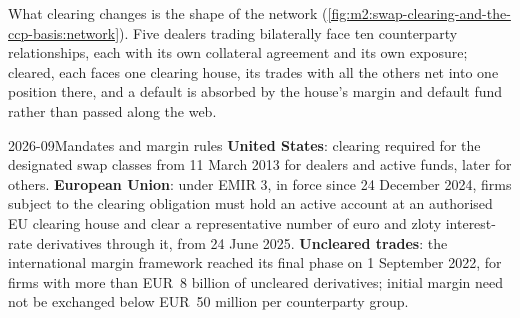 What clearing changes is the shape of the network
(\cref{fig:m2:swap-clearing-and-the-ccp-basis:network}). Five dealers trading
bilaterally face ten counterparty relationships, each with its own collateral
agreement and its own exposure; cleared, each faces one clearing house, its
trades with all the others net into one position there, and a default is
absorbed by the house's margin and default fund rather than passed along the
web.

\begin{omfigure}
\centering
{}

\label{fig:m2:swap-clearing-and-the-ccp-basis:network}
\end{omfigure}

\begin{dated}{2026-09}{Mandates and margin rules}\label{dat:m2:swap-clearing-and-the-ccp-basis:mandates}
\textbf{United States}: clearing required for the designated swap classes from
11 March 2013 for dealers and active funds, later for others. \textbf{European
Union}: under EMIR 3, in force since 24 December 2024, firms subject to the
clearing obligation must hold an active account at an authorised EU clearing
house and clear a representative number of euro and zloty interest-rate
derivatives through it, from 24 June 2025. \textbf{Uncleared trades}: the
international margin framework reached its final phase on 1 September 2022, for
firms with more than EUR~8 billion of uncleared derivatives; initial margin need
not be exchanged below EUR~50 million per counterparty group.
\end{dated}

